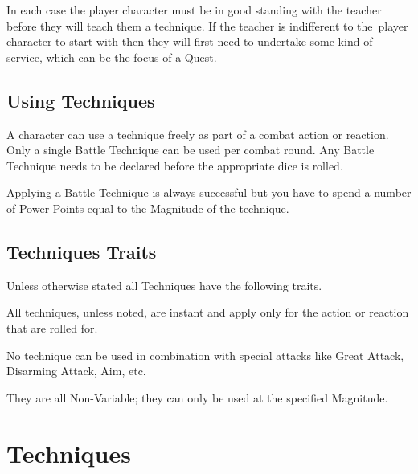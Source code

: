 In each case the player character must be in good standing with the teacher before they will teach them a technique. If the teacher is indifferent to the player character to start with then they will first need to undertake some kind of service, which can be the focus of a Quest.

\subsection{Using Techniques}
A character can use a technique freely as part of a combat action or reaction. Only a single Battle Technique can be used per combat round. Any Battle Technique needs to be declared before the appropriate dice is rolled.

Applying a Battle Technique is always successful but you have to spend a number of Power Points equal to the Magnitude of the technique.


\subsection{Techniques Traits}
Unless otherwise stated all Techniques have the following traits.

\begin{rpg-list}
\item All techniques, unless noted, are instant and apply only for the action or reaction that are rolled for.
\item No technique can be used in combination with special attacks like Great Attack, Disarming Attack, Aim, etc.
\item They are all Non-Variable; they can only be used at the specified Magnitude.
\end{rpg-list}


\section{Techniques}

